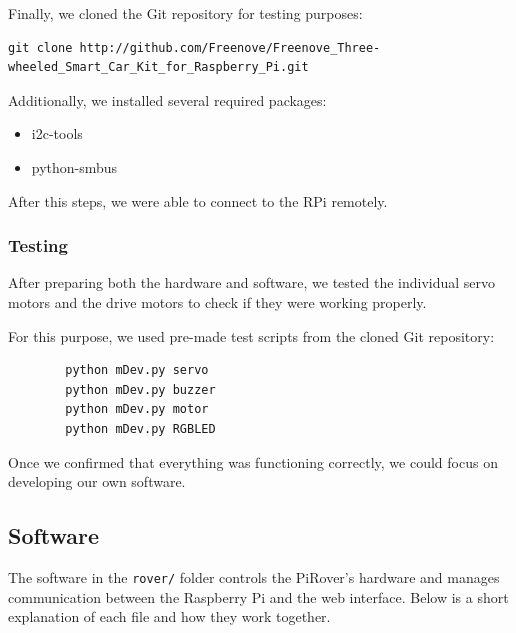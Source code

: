     Finally, we cloned the Git repository for testing purposes:
    \begin{verbatim}
git clone http://github.com/Freenove/Freenove_Three-wheeled_Smart_Car_Kit_for_Raspberry_Pi.git
    \end{verbatim}

    Additionally, we installed several required packages:
    \begin{itemize}
        \item i2c-tools
        \item python-smbus
    \end{itemize}

    After this steps, we were able to connect to the RPi remotely.

    \subsubsection{Testing}
    After preparing both the hardware and software, we tested the individual servo motors and the drive motors to check if they were working properly.

    For this purpose, we used pre-made test scripts from the cloned Git repository:
    \begin{verbatim}
        python mDev.py servo
        python mDev.py buzzer
        python mDev.py motor
        python mDev.py RGBLED
    \end{verbatim}

    Once we confirmed that everything was functioning correctly, we could focus on developing our own software.

    \subsection{Software}

    The software in the \texttt{rover/} folder controls the PiRover's hardware and manages communication between the Raspberry Pi and the web interface. Below is a short explanation of each file and how they work together.

